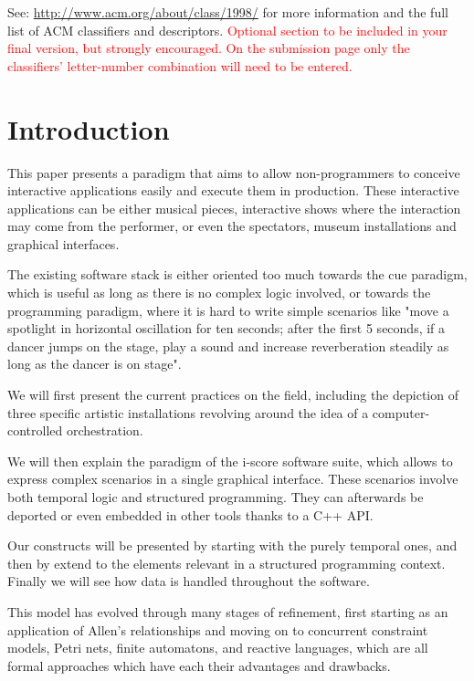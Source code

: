 \documentclass{sigchi}
\begin{document}

See: \url{http://www.acm.org/about/class/1998/}
for more information and the full list of ACM classifiers
and descriptors. \newline
\textcolor{red}{Optional section to be included in your final version, 
but strongly encouraged. On the submission page only the classifiers’ 
letter-number combination will need to be entered.}

\section{Introduction}
This paper presents a paradigm that aims to allow non-programmers 
to conceive interactive applications easily and execute them in production. These interactive applications can be either musical pieces, interactive shows where the interaction may come from the performer, or even the spectators, museum installations and graphical interfaces.

The existing software stack is either oriented too much towards the 
cue paradigm, which is useful as long as there is no complex logic involved, 
or towards the programming paradigm, where it is hard to write simple scenarios 
like "move a spotlight in horizontal oscillation for ten seconds; after the first 5 
seconds, if a dancer jumps on the stage, play a sound and increase reverberation steadily as long as the dancer is on stage".

We will first present the current practices on the field, including the depiction of three specific artistic installations revolving around the idea of a computer-controlled orchestration.

We will then explain the paradigm of the i-score software suite, which allows to express complex scenarios in a single graphical interface. These scenarios involve both temporal logic and structured programming. They can afterwards be deported or even embedded in other tools thanks to a C++ API. 

Our constructs will be presented by starting with the purely temporal ones, 
and then by extend to the elements relevant in a structured programming context.
Finally we will see how data is handled throughout the software.

This model has evolved through many stages of refinement, first starting as an application of 
Allen's relationships\cite{allen1983maintaining} and moving on to concurrent constraint models\cite{allombert2006concurrent,toro2010concurrent}, Petri nets\cite{allombert2007system,arias2014modelling}, finite automatons\cite{arias2015exploiting}, and reactive languages\cite{ariasexecuting}, which are all formal approaches which have each their advantages and drawbacks. 
\end{document}
